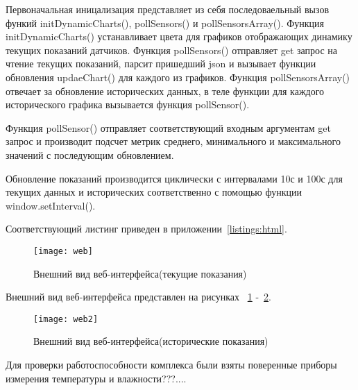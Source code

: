 Первоначальная иницализация представляет из себя последоваельный вызов функий initDynamicCharts(), pollSensors() и pollSensorsArray(). Функция initDynamicCharts() устанавливает цвета для графиков отображающих динамику текущих показаний датчиков.  Функция pollSensors() отправляет get запрос на чтение текущих показаний, парсит пришедший json и вызывает функции обновления updaeChart() для каждого из графиков. 
Функция pollSensorsArray() отвечает за обновление исторических данных, в теле функции для каждого исторического графика вызывается функция pollSensor(). 

Функция pollSensor() отправляет соответствующий входным аргументам get запрос и производит подсчет метрик среднего, минимального и максимального значений с последующим обновлением.

Обновление показаний производится циклически с интервалами 10с и 100с для текущих данных и исторических соответственно с помощью функции window.setInterval(). 

Соответствующий листинг приведен в приложении~\ref{listings:html}.
\begin{figure}[h]
	\centering
	\texttt{[image: web]}
	\caption{Внешний вид веб-интерфейса(текущие показания)}
	\label{fig:web}
\end{figure}

Внешний вид веб-интерфейса представлен на рисунках ~\ref{fig:web} -~\ref{fig:web2}.

\begin{figure}[h]
	\centering
	\texttt{[image: web2]} 
	\caption{Внешний вид веб-интерфейса(исторические показания)}
	\label{fig:web2}
\end{figure}

Для проверки работоспособности комплекса были взяты поверенные приборы измерения температуры и влажности???....



%
%





